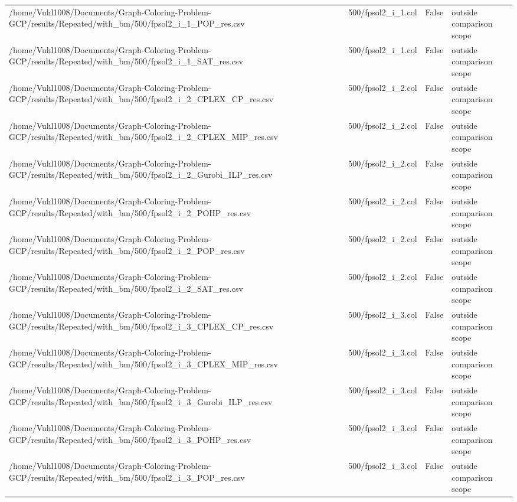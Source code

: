 \begin{table}[htbp]
\begin{tabular}{llll}
/home/Vuhl1008/Documents/Graph-Coloring-Problem-GCP/results/Repeated/with\_bm/500/fpsol2\_i\_1\_POP\_res.csv & 500/fpsol2\_i\_1.col & False & outside comparison scope \\
/home/Vuhl1008/Documents/Graph-Coloring-Problem-GCP/results/Repeated/with\_bm/500/fpsol2\_i\_1\_SAT\_res.csv & 500/fpsol2\_i\_1.col & False & outside comparison scope \\
/home/Vuhl1008/Documents/Graph-Coloring-Problem-GCP/results/Repeated/with\_bm/500/fpsol2\_i\_2\_CPLEX\_CP\_res.csv & 500/fpsol2\_i\_2.col & False & outside comparison scope \\
/home/Vuhl1008/Documents/Graph-Coloring-Problem-GCP/results/Repeated/with\_bm/500/fpsol2\_i\_2\_CPLEX\_MIP\_res.csv & 500/fpsol2\_i\_2.col & False & outside comparison scope \\
/home/Vuhl1008/Documents/Graph-Coloring-Problem-GCP/results/Repeated/with\_bm/500/fpsol2\_i\_2\_Gurobi\_ILP\_res.csv & 500/fpsol2\_i\_2.col & False & outside comparison scope \\
/home/Vuhl1008/Documents/Graph-Coloring-Problem-GCP/results/Repeated/with\_bm/500/fpsol2\_i\_2\_POHP\_res.csv & 500/fpsol2\_i\_2.col & False & outside comparison scope \\
/home/Vuhl1008/Documents/Graph-Coloring-Problem-GCP/results/Repeated/with\_bm/500/fpsol2\_i\_2\_POP\_res.csv & 500/fpsol2\_i\_2.col & False & outside comparison scope \\
/home/Vuhl1008/Documents/Graph-Coloring-Problem-GCP/results/Repeated/with\_bm/500/fpsol2\_i\_2\_SAT\_res.csv & 500/fpsol2\_i\_2.col & False & outside comparison scope \\
/home/Vuhl1008/Documents/Graph-Coloring-Problem-GCP/results/Repeated/with\_bm/500/fpsol2\_i\_3\_CPLEX\_CP\_res.csv & 500/fpsol2\_i\_3.col & False & outside comparison scope \\
/home/Vuhl1008/Documents/Graph-Coloring-Problem-GCP/results/Repeated/with\_bm/500/fpsol2\_i\_3\_CPLEX\_MIP\_res.csv & 500/fpsol2\_i\_3.col & False & outside comparison scope \\
/home/Vuhl1008/Documents/Graph-Coloring-Problem-GCP/results/Repeated/with\_bm/500/fpsol2\_i\_3\_Gurobi\_ILP\_res.csv & 500/fpsol2\_i\_3.col & False & outside comparison scope \\
/home/Vuhl1008/Documents/Graph-Coloring-Problem-GCP/results/Repeated/with\_bm/500/fpsol2\_i\_3\_POHP\_res.csv & 500/fpsol2\_i\_3.col & False & outside comparison scope \\
/home/Vuhl1008/Documents/Graph-Coloring-Problem-GCP/results/Repeated/with\_bm/500/fpsol2\_i\_3\_POP\_res.csv & 500/fpsol2\_i\_3.col & False & outside comparison scope \\

\end{tabular}
\end{table}
